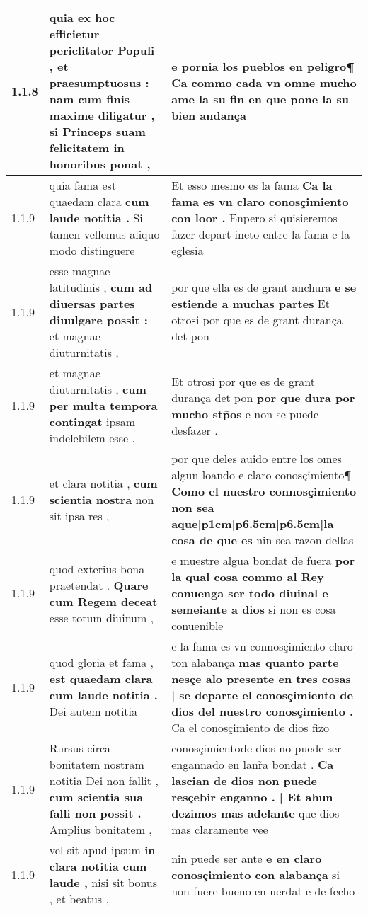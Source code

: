 \begin{tabular}{|p{1cm}|p{6.5cm}|p{6.5cm}|}
1.1.8 & quia ex hoc efficietur periclitator Populi , et praesumptuosus : \textbf{ nam cum finis maxime diligatur , } si Princeps suam felicitatem in honoribus ponat , & e pornia los pueblos en peligro¶ \textbf{ Ca commo cada vn omne mucho ame la su fin } en que pone la su bien andança \\\hline
1.1.9 & quia fama est quaedam clara \textbf{ cum laude notitia . } Si tamen vellemus aliquo modo distinguere & Et esso mesmo es la fama \textbf{ Ca la fama es vn claro conosçimiento con loor . } Enpero si quisieremos fazer depart ineto entre la fama e la eglesia \\\hline
1.1.9 & esse magnae latitudinis , \textbf{ cum ad diuersas partes diuulgare possit : } et magnae diuturnitatis , & por que ella es de grant anchura \textbf{ e se estiende a muchas partes } Et otrosi por que es de grant durança det pon \\\hline
1.1.9 & et magnae diuturnitatis , \textbf{ cum per multa tempora contingat } ipsam indelebilem esse . & Et otrosi por que es de grant durança det pon \textbf{ por que dura por mucho stp̃os } e non se puede desfazer . \\\hline
1.1.9 & et clara notitia , \textbf{ cum scientia nostra } non sit ipsa res , & por que deles auido entre los omes algun loando e claro conosçimiento¶ \textbf{ Como el nuestro connosçimiento non sea aque|p{1cm}|p{6.5cm}|p{6.5cm}|la cosa de que es } nin sea razon dellas \\\hline
1.1.9 & quod exterius bona praetendat . \textbf{ Quare cum Regem deceat } esse totum diuinum , & e muestre algua bondat de fuera \textbf{ por la qual cosa commo al Rey conuenga ser todo diuinal e semeiante a dios } si non es cosa conuenible \\\hline
1.1.9 & quod gloria et fama , \textbf{ est quaedam clara cum laude notitia . } Dei autem notitia & e la fama es vn connosçimiento claro ton alabança \textbf{ mas quanto parte nesçe alo presente en tres cosas | se departe el conosçimiento de dios del nuestro conosçimiento . } Ca el conosçimiento de dios fizo \\\hline
1.1.9 & Rursus circa bonitatem nostram notitia Dei non fallit , \textbf{ cum scientia sua falli non possit . } Amplius bonitatem , & conosçimientode dios no puede ser engannado en lanr̃a bondat . \textbf{ Ca lascian de dios non puede resçebir enganno . | Et ahun dezimos mas adelante } que dios mas claramente vee \\\hline
1.1.9 & vel sit apud ipsum \textbf{ in clara notitia cum laude , } nisi sit bonus , et beatus , & nin puede ser ante \textbf{ e en claro conosçimiento con alabança } si non fuere bueno en uerdat e de fecho \\\hline

\end{tabular}
